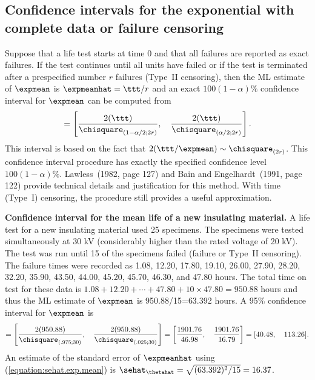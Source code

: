 \subsection{Confidence intervals for the exponential
with complete data or failure censoring} Suppose that a life test
starts at time 0 and that all failures are reported as exact
failures. If the test continues until all units have failed or if the
test is terminated after a prespecified number $r$ failures
(Type~II censoring), then the ML estimate of $\expmean$ is
$\expmeanhat=\ttt/r$ and an exact $100(1-\alpha)\%$ confidence
interval for $\expmean$ can be computed from
\begin{displaymath}
 [ \undertilde{\expmean}, \quad \tilde{\expmean}] =
\left[ \frac{2(\ttt)}{\chisquare_{(1-\alpha/2;2r)}}, \quad
\frac{2(\ttt)}
{\chisquare_{(\alpha/2;2r)}} \right].
\end{displaymath}
This interval is based on the fact that $2(\ttt/ \expmean) \sim
\chisquare_{(2r)}$. This confidence interval
procedure has exactly the specified confidence level
$100(1-\alpha)\%$.  Lawless~(1982, page 127) and Bain and
Engelhardt~(1991, page 122) provide technical details and
justification for this method. With time (Type~I) censoring, the
procedure still provides a useful approximation.
\begin{example}
\label{example:insul.type2}
{\bf Confidence interval for the mean life of a new insulating
material.} A life test for a new insulating material used 25
specimens.  The specimens were tested simultaneously at 30 kV
(considerably higher than the rated voltage of 20 kV). The test was
run until 15 of the specimens failed (failure or Type~II censoring).
The failure times were recorded as 1.08, 12.20, 17.80, 19.10, 26.00,
27.90, 28.20, 32.20, 35.90, 43.50, 44.00, 45.20, 45.70, 46.30, and
47.80 hours.  The total time on test for these data is $1.08 + 12.20 +
\cdots + 47.80 + 10\times 47.80 = 950.88$ hours and thus the ML
estimate of $\expmean$ is 950.88/15=63.392 hours. A 95\%
confidence interval for $\expmean$ is
\begin{displaymath}
 [ \undertilde{\expmean}, \quad \tilde{\expmean}] =
\left [ \frac{2(950.88)}{\chisquare_{(.975;30)}}, \quad
\frac{2(950.88)}{\chisquare_{(.025;30)}} \right ] =
\left [ \frac{1901.76}{46.98}, \quad
\frac{ 1901.76 }{ 16.79 } \right ] = [ 40.48, \quad 113.26 ].
\end{displaymath}
An estimate of the standard error of $\expmeanhat$ 
using (\ref{equation:sehat.exp.mean}) is $\sehat_{\thetahat}=
\sqrt{(63.392)^{2}/15}=16.37$.
\end{example}


